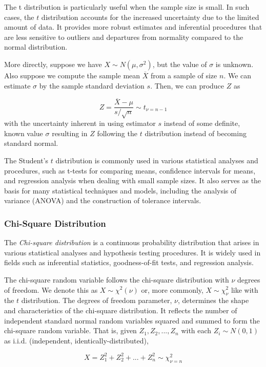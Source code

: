 \documentclass{article}
\begin{document}
The t distribution is particularly useful when the sample size is small. In such cases, the $t$ distribution accounts for the increased uncertainty due to the limited amount of data. It provides more robust estimates and inferential procedures that are less sensitive to outliers and departures from normality compared to the normal distribution.

More directly, suppose we have $X \sim N(\mu, \sigma^2)$, but the value of $\sigma$ is unknown. Also suppose we compute the sample mean $\overline{X}$ from a sample of size $n$. We can estimate $\sigma$ by the sample standard deviation $s$. Then, we can produce $Z$ as

$$
Z = \frac{\overline{X} - \mu}{s/\sqrt{n}} \sim t_{\nu = n - 1}
$$
with the uncertainty inherent in using estimator $s$ instead of some definite, known value $\sigma$ resulting in $Z$ following the $t$ distribution instead of becoming standard normal.

The Student's $t$ distribution is commonly used in various statistical analyses and procedures, such as t-tests for comparing means, confidence intervals for means, and regression analysis when dealing with small sample sizes. It also serves as the basis for many statistical techniques and models, including the analysis of variance (ANOVA) and the construction of tolerance intervals.

\subsubsection{Chi-Square Distribution}

The \emph{Chi-square distribution} is a continuous probability distribution that arises in various statistical analyses and hypothesis testing procedures. It is widely used in fields such as inferential statistics, goodness-of-fit tests, and regression analysis.

The chi-square random variable follows the chi-square distribution with $\nu$ degrees of freedom. We denote this as $X \sim \chi^2(\nu)$ or, more commonly, $X \sim \chi^2_\nu$ like with the $t$ distribution. The degrees of freedom parameter, $\nu$, determines the shape and characteristics of the chi-square distribution. It reflects the number of independent standard normal random variables squared and summed to form the chi-square random variable. That is, given $Z_1, Z_2, ..., Z_n$ with each $Z_i \sim N(0,1)$ as i.i.d. (independent, identically-distributed),

$$
X = Z^2_1 + Z^2_2 + ... + Z^2_n \sim \chi^2_{\nu = n}
$$
\end{document}
